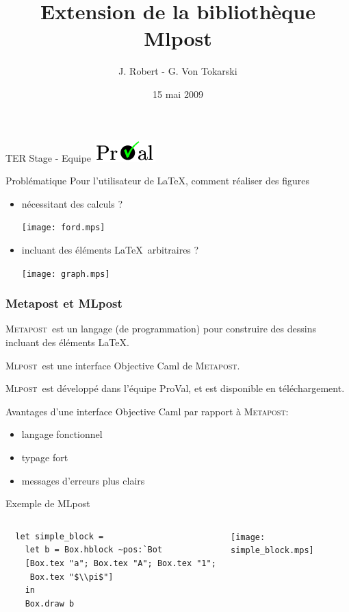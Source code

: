 \documentclass{beamer}
\title{Extension de la bibliothèque Mlpost}
\author{J. Robert - G. Von Tokarski}
\date{15 mai 2009}
\newcommand{\mlpost}{\textsc{Mlpost}}
\newcommand{\meta}{\textsc{Metapost}}
\begin{document}
\begin{frame}
  \maketitle

  \begin{center}
    TER Stage - Equipe \includegraphics[scale=0.4]{proval.png}
  \end{center}
\end{frame}

\begin{frame}{Problématique}
  Pour l'utilisateur de \LaTeX, comment réaliser des figures
  \begin{itemize}
  \item nécessitant des calculs ?
  \begin{center}
    \texttt{[image: ford.mps]}
  \end{center}

  \bigskip
  \item incluant des éléments \LaTeX\ arbitraires ?
    \bigskip
    \begin{center}
      \texttt{[image: graph.mps]}
    \end{center}
  \end{itemize}
\end{frame}

\begin{frame}[fragile]\frametitle{Metapost et MLpost}
  \meta\ est un langage (de programmation) pour construire des dessins incluant des éléments \LaTeX.

  \bigskip
  \mlpost\ est une interface Objective Caml de \meta.

  \mlpost\ est développé dans l'équipe ProVal, et est disponible en téléchargement. 
  \bigskip

  Avantages d'une interface Objective Caml par rapport à \meta:
  \begin{itemize}
  \item langage fonctionnel
  \item typage fort
  \item messages d'erreurs plus clairs
  \end{itemize}

\end{frame}

\begin{frame}[fragile]{Exemple de MLpost}  
  \begin{columns}
    \small
    \begin{verbatim}
  let simple_block =
    let b = Box.hblock ~pos:`Bot 
    [Box.tex "a"; Box.tex "A"; Box.tex "1"; 
     Box.tex "$\\pi$"] 
    in
    Box.draw b
    \end{verbatim}
    \texttt{[image: simple\_block.mps]}
  \end{columns}
\end{frame}
\end{document}
